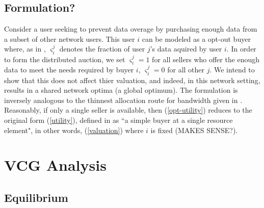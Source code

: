 \documentclass[12pt]{article}
\theoremstyle{definition}
\newcommand{\vs}{\varsigma}
\begin{document}
\begin{multicols}{2}
\subsection{Formulation?}
Consider a user seeking to prevent
data overage by purchasing enough data from a subset of other network users.
This user $i$ can be modeled as a opt-out buyer where, as in \cite{semret}, $\vs_i^j$ denotes the
fraction of user $j$'s data aquired by user $i$. In order to form the
distributed auction, we set $\vs_i^j=1$ for all sellers who offer the enough data to meet the needs required by buyer $i$,
$\vs_i^j = 0$ for all other $j$. We intend to show that this does not affect thier valuation, and
indeed, in this network setting, results in a shared network optima (a
global optimum). The formulation is inversely analogous to the thinnest allocation route for
bandwidth given in \cite{lazar}. Reasonably, if only a single seller is available, then
(\ref{opt-utility}) reduces to the original form (\ref{utility}), defined in
\cite{semret} as ``a simple buyer at a single resource element", in other
words, (\ref{valuation}) where $i$ is fixed (MAKES SENSE?).

\section{VCG Analysis}
\subsection{Equilibrium}


\end{multicols}
\end{document}
